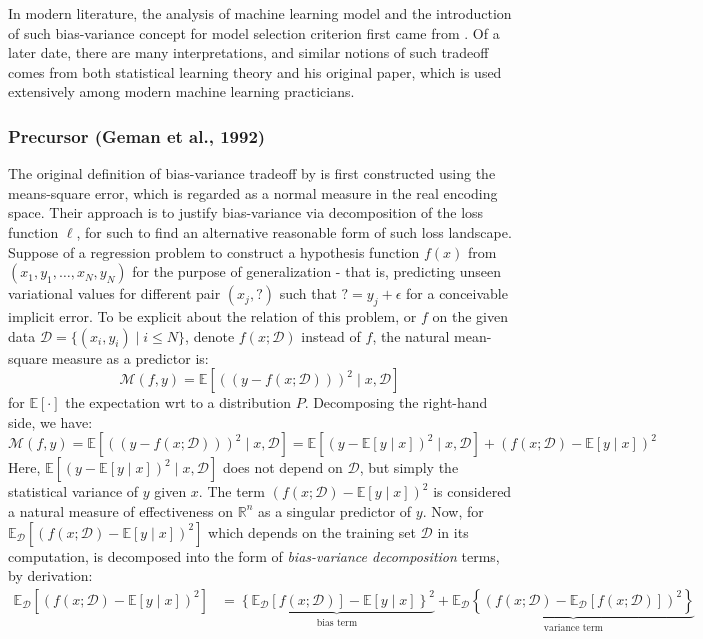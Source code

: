 \documentclass[10pt]{article}
\begin{document}
In modern literature, the analysis of machine learning model and the introduction of such bias-variance concept for model selection criterion first came from \cite{6797087}. Of a later date, there are many interpretations, and similar notions of such tradeoff comes from both statistical learning theory and his original paper, which is used extensively among modern machine learning practicians. 
\subsubsection{Precursor (Geman et al., 1992)}

The original definition of bias-variance tradeoff by \cite{6797087} is first constructed using the means-square error, which is regarded as a normal measure in the real encoding space. Their approach is to justify bias-variance via decomposition of the loss function $\ell$, for such to find an alternative reasonable form of such loss landscape. Suppose of a regression problem to construct a hypothesis function $f(x)$ from $(x_{1},y_{1},\dots,x_{N},y_{N})$ for the purpose of generalization - that is, predicting unseen variational values for different pair $(x_{j}, \mathord{?})$ such that $\mathord{?}=y_{j}+\epsilon$ for a conceivable implicit error. To be explicit about the relation of this problem, or $f$ on the given data $\mathcal{D}=\{(x_i, y_i)\mid i \leq N\}$, denote $f(x;\mathcal{D})$ instead of $f$, the natural mean-square measure as a predictor is: 
\begin{equation}
    \mathcal{M}(f,y) = \mathbb{E} \left[((y-f(x;\mathcal{D})))^{2}\mid x, \mathcal{D}\right] 
\end{equation} for $\mathbb{E}[\cdot]$ the expectation wrt to a distribution $P$. Decomposing the right-hand side, we have: 
\begin{equation}
    \mathcal{M}(f,y) = \mathbb{E} \left[((y-f(x;\mathcal{D})))^{2}\mid x, \mathcal{D}\right] = \mathbb{E}\left[(y-\mathbb{E}[y\mid x])^{2}\mid x,\mathcal{D}\right] + (f(x;\mathcal{D})-\mathbb{E}[y\mid x])^{2}
\end{equation}
Here, $\mathbb{E}\left[(y-\mathbb{E}[y\mid x])^{2}\mid x,\mathcal{D}\right]$ does not depend on $\mathcal{D}$, but simply the statistical variance of $y$ given $x$. The term $(f(x;\mathcal{D})-\mathbb{E}[y\mid x])^{2}$ is considered a natural measure of effectiveness on $\mathbb{R}^{n}$ as a singular predictor of $y$. Now, for $\mathbb{E}_{\mathcal{D}}\left[(f(x;\mathcal{D})-\mathbb{E}[y\mid x])^{2}\right]$ which depends on the training set $\mathcal{D}$ in its computation, is decomposed into the form of \textit{bias-variance decomposition} terms, by derivation: 
\begin{equation}
    \begin{split}
        \mathbb{E}_{\mathcal{D}} \left[(f(x;\mathcal{D})-\mathbb{E}[y\mid x])^{2}\right] & = \underbrace{\left\{ \mathbb{E}_{\mathcal{D}}[f(x;\mathcal{D})] - \mathbb{E}[y\mid x] \right\}^{2}}_{\text{bias term}} + \underbrace{\mathbb{E}_{\mathcal{D}} \left\{(f(x;\mathcal{D})- \mathbb{E}_{\mathcal{D}}[f(x;\mathcal{D})])^{2}\right\}}_{\text{variance term}}
    \end{split}
\end{equation}
\end{document}
